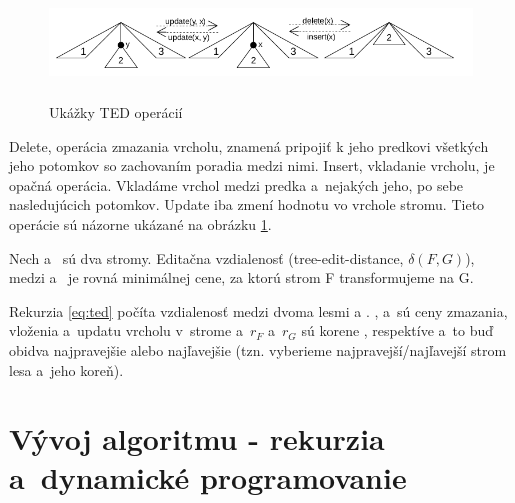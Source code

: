\begin{figure}[H]
\centering
\includegraphics[width=140mm, height=30mm]{../img/TED_operations.png}
\caption{Ukážky TED operácií}
\label{obr:TED_operations}
\end{figure}

Delete, operácia zmazania vrcholu, znamená pripojiť k jeho predkovi všetkých jeho
potomkov so zachovaním poradia medzi nimi. Insert, vkladanie vrcholu, je opačná
operácia. Vkladáme vrchol medzi predka a~nejakých jeho, po sebe nasledujúcich
potomkov. Update iba zmení hodnotu vo vrchole stromu.
Tieto operácie sú názorne ukázané na obrázku \ref{obr:TED_operations}.

\begin{definice}
  Nech  a~ sú dva stromy. Editačna vzdialenosť (tree-edit-distance, $\delta(F, G)$),
  medzi  a~ je rovná minimálnej cene, za ktorú strom F transformujeme na G.
\end{definice}

Rekurzia \ref{eq:ted} počíta vzdialenosť medzi dvoma lesmi  a .
\Cdel, \Cins a~\Cupd sú ceny zmazania, vloženia a~updatu vrcholu v~strome
a~$r_{F}$ a~$r_{G}$ sú korene , respektíve  a~to buď obidva najpravejšie
alebo najľavejšie (tzn. vyberieme najpravejší/najľavejší strom lesa a~jeho koreň).







\section{\sloppy Vývoj algoritmu - rekurzia a~dynamické programovanie}

